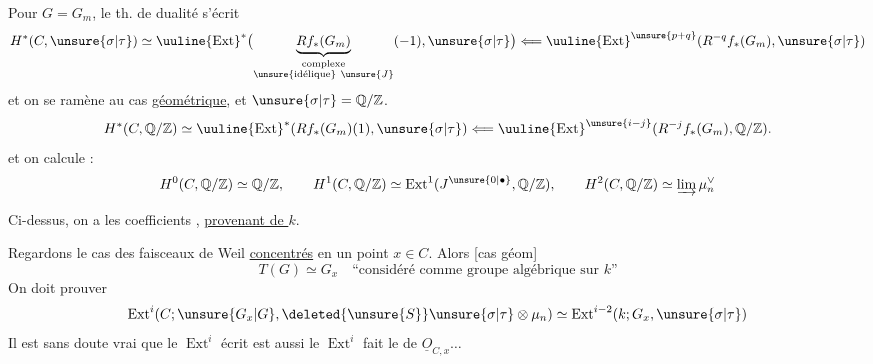 Pour $G=G_m$, le th. de dualité s'écrit 
\[
H^*(C,\unsure{\sigma|\tau})\simeq
\uuline{\operatorname{Ext}}^*\bigl(\underbrace{Rf_*(G_m)}_{\substack{\text{complexe}\\\text{\unsure{idélique}}\ \unsure{J}}}(-1),\unsure{\sigma|\tau}\bigr)
\Longleftarrow\uuline{\operatorname{Ext}}^{\unsure{p+q}}(R^{-q}f_*(G_m),\unsure{\sigma|\tau})
\]
et on se ramène au cas \uline{géométrique}, et $\unsure{\sigma|\tau}=\mathbb Q/\mathbb Z$.
\[
H^*(C,\mathbb Q/\mathbb Z)\simeq\uuline{\operatorname{Ext}}^*(Rf_*(G_m)(1),\unsure{\sigma|\tau})
\Longleftarrow\uuline{\operatorname{Ext}}^{\unsure{i-j}}(R^{-j}f_*(G_m),\mathbb Q/\mathbb Z).
\]
et on calcule :
\[
H^0(C,\mathbb Q/\mathbb Z)\simeq\mathbb Q/\mathbb Z,\qquad
H^1(C,\mathbb Q/\mathbb Z)\simeq\operatorname{Ext}^1(J^{\unsure{0|\bullet}},\mathbb Q/\mathbb Z),\qquad
H^2(C,\mathbb Q/\mathbb Z)\simeq\varinjlim\mu_n^\vee
\]


Ci-dessus, on a  les coefficients  , \uline{provenant de $k$}.

Regardons le cas des faisceaux de Weil \uline{concentrés} en un point $x\in C$. Alors  [cas géom]
\[
T(G)\simeq G_x\quad\text{``considéré comme groupe algébrique sur $k$''}
\]
On doit prouver
\[
\operatorname{Ext}^i(C;\unsure{G_x|G},\deleted{\unsure{S}}\unsure{\sigma|\tau}\otimes\mu_n)\simeq
\operatorname{Ext}^{i-2}(k;G_x,\unsure{\sigma|\tau})
\]
Il est sans doute vrai que le $\operatorname{Ext}^i$ écrit est aussi le $\operatorname{Ext}^i$  fait  le  de $\underline O_{C,x}\ldots$

